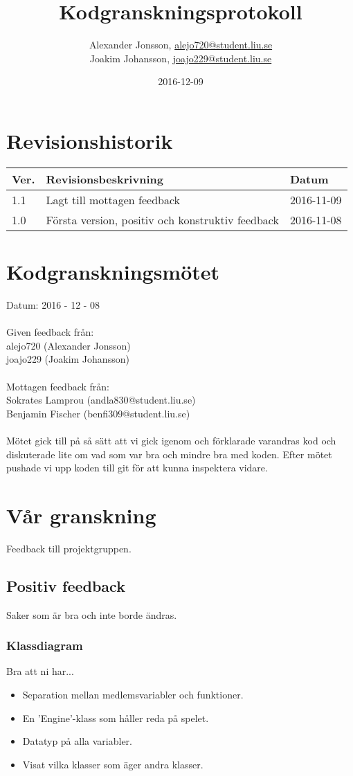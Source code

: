 \documentclass{TDP003mall}
\author{Alexander Jonsson, \url{alejo720@student.liu.se}\\
  Joakim Johansson, \url{joajo229@student.liu.se}}
\title{Kodgranskningsprotokoll}
\date{2016-12-09}
\begin{document}
\projectpage
\section{Revisionshistorik}
\begin{table}[!h]
\begin{tabularx}{\linewidth}{|l|X|l|}
\hline
Ver. & Revisionsbeskrivning & Datum \\\hline
1.1 & Lagt till mottagen feedback & 2016-11-09 \\\hline
1.0 & Första version, positiv och konstruktiv feedback & 2016-11-08 \\\hline
\end{tabularx}
\end{table}

\section{Kodgranskningsmötet}
Datum: 2016 - 12 - 08 
\\ \\
Given feedback från: \\
alejo720 (Alexander Jonsson) \\
joajo229 (Joakim Johansson) 
\\ \\
Mottagen feedback från: \\
Sokrates Lamprou (andla830@student.liu.se) \\
Benjamin Fischer (benfi309@student.liu.se)
\\ \\
Mötet gick till på så sätt att vi gick igenom och förklarade varandras kod och diskuterade lite om vad som var bra och mindre bra med koden. Efter mötet pushade vi upp koden till git för att kunna inspektera vidare.

\newpage

\section{Vår granskning}
Feedback till projektgruppen.
\subsection{Positiv feedback}
Saker som är bra och inte borde ändras.
\subsubsection{Klassdiagram}
Bra att ni har...
\begin{itemize}
\item Separation mellan medlemsvariabler och funktioner.
\item En 'Engine'-klass som håller reda på spelet.
\item Datatyp på alla variabler.
\item Visat vilka klasser som äger andra klasser.
\end{itemize}
\end{document}
